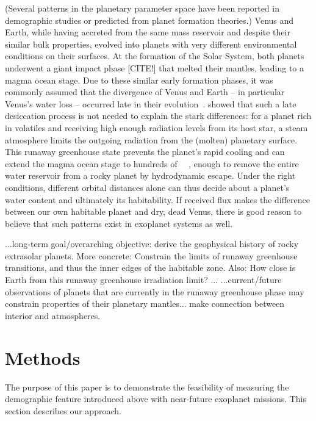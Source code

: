 \documentclass[modern]{aastex631}
\begin{document}
\begin{note}
(Several patterns in the planetary parameter space have been reported in demographic studies or predicted from planet formation theories.)
    Venus and Earth, while having accreted from the same mass reservoir and despite their similar bulk properties, evolved into planets with very different environmental conditions on their surfaces.
    At the formation of the Solar System, both planets underwent a giant impact phase [CITE!] that melted their mantles, leading to a magma ocean stage.
    Due to these similar early formation phases, it was commonly assumed that the divergence of Venus and Earth -- in particular Venus's water loss -- occurred late in their evolution~\citep{Elkins-Tanton2013}.
    \citet{Hamano2013} showed that such a late desiccation process is not needed to explain the stark differences: for a planet rich in volatiles and receiving high enough radiation levels from its host star, a steam atmosphere limits the outgoing radiation from the (molten) planetary surface.
    This runaway greenhouse state prevents the planet's rapid cooling and can extend the magma ocean stage to hundreds of \SI{}{\mega\year}, enough to remove the entire water reservoir from a rocky planet by hydrodynamic escape.
    Under the right conditions, different orbital distances alone can thus decide about a planet's water content and ultimately its habitability.
    If received flux makes the difference between our own habitable planet and dry, dead Venus, there is good reason to believe that such patterns exist in exoplanet systems as well.

    ...long-term goal/overarching objective: derive the geophysical history of rocky extrasolar planets. More concrete: Constrain the limits of runaway greenhouse transitions, and thus the inner edges of the habitable zone. Also: How close is Earth from this runaway greenhouse irradiation limit?
   ...
    ...current/future observations of planets that are currently in the runaway greenhouse phase may constrain properties of their planetary mantles... make connection between interior and atmospheres.
\end{note}


\section{Methods}\label{sec:methods}
The purpose of this paper is to demonstrate the feasibility of measuring the demographic feature introduced above with near-future exoplanet missions.
This section describes our approach.
\end{document}
